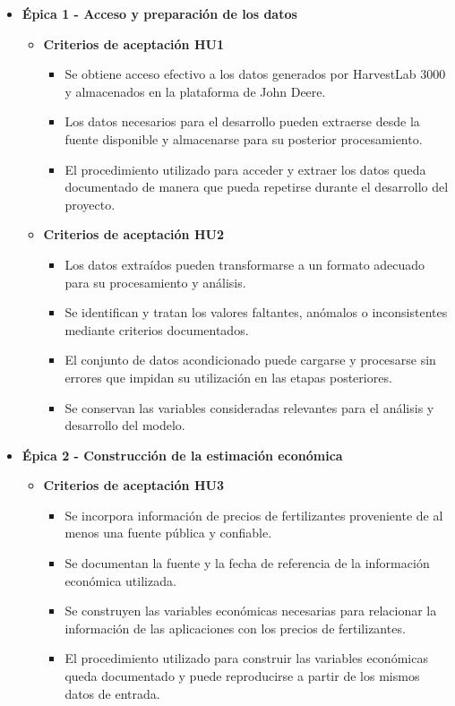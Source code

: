 \documentclass[
11pt, %
]{charter}
\begin{document}
\begin{itemize}

  \item \textbf{\'{E}pica 1 - Acceso y preparación de los datos}
    \begin{itemize}

      \item \textbf{Criterios de aceptación HU1}
        \begin{itemize}
          \item Se obtiene acceso efectivo a los datos generados por HarvestLab 3000 y almacenados en la plataforma de John Deere.
          \item Los datos necesarios para el desarrollo pueden extraerse desde la fuente disponible y almacenarse para su posterior procesamiento.
          \item El procedimiento utilizado para acceder y extraer los datos queda documentado de manera que pueda repetirse durante el desarrollo del proyecto.
        \end{itemize}

      \item \textbf{Criterios de aceptación HU2}
        \begin{itemize}
          \item Los datos extraídos pueden transformarse a un formato adecuado para su procesamiento y análisis.
          \item Se identifican y tratan los valores faltantes, anómalos o inconsistentes mediante criterios documentados.
          \item El conjunto de datos acondicionado puede cargarse y procesarse sin errores que impidan su utilización en las etapas posteriores.
          \item Se conservan las variables consideradas relevantes para el análisis y desarrollo del modelo.
        \end{itemize}

    \end{itemize}


  \item \textbf{\'{E}pica 2 - Construcción de la estimación económica}
    \begin{itemize}

      \item \textbf{Criterios de aceptación HU3}
        \begin{itemize}
          \item Se incorpora información de precios de fertilizantes proveniente de al menos una fuente pública y confiable.
          \item Se documentan la fuente y la fecha de referencia de la información económica utilizada.
          \item Se construyen las variables económicas necesarias para relacionar la información de las aplicaciones con los precios de fertilizantes.
          \item El procedimiento utilizado para construir las variables económicas queda documentado y puede reproducirse a partir de los mismos datos de entrada.
        \end{itemize}


\end{itemize}
\end{itemize}
\end{document}
